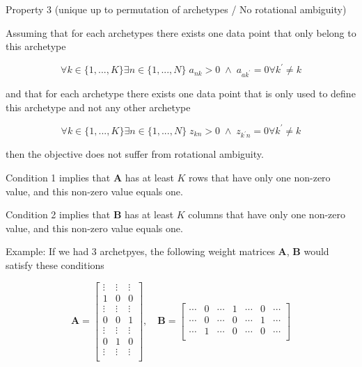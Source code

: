 \documentclass[oneside]{article}
\begin{document}
Property 3 (unique up to permutation of archetypes / No rotational ambiguity) 

Assuming that for each archetypes there exists one data point that only belong to this archetype

\begin{equation}
    \label{eq:cond1}
    \forall k \in \{1, ..., K\} \exists n \in \{1, ..., N\} \; a_{n k} > 0 \; \land \; a_{a k^\prime} = 0 \forall k^\prime \neq k
\end{equation}

and that for each archetype there exists one data point that is only used to define this archetype and not any other archetype

\begin{equation}
    \label{eq:cond2}
    \forall k \in \{1, ..., K\} \exists n \in \{1, ..., N\} \; z_{k n} > 0 \; \land \; z_{k^\prime n} = 0 \forall k^\prime \neq k
\end{equation}

then the objective does not suffer from rotational ambiguity. 

Condition 1 implies that $\mathbf{A}$ has at least $K$ rows that have only one non-zero value, and this non-zero value equals one.

Condition 2 implies that $\mathbf{B}$ has at least $K$ columns that have only one non-zero value, and this non-zero value equals one.

Example: If we had $3$ archetpyes, the following weight matrices $\mathbf{A}$, $\mathbf{B}$ would satisfy these conditions

\begin{equation}
    \mathbf{A} =     
    \left[
        \begin{array}{ccc}
            \vdots & \vdots & \vdots \\
            1 & 0 & 0 \\
            \vdots & \vdots & \vdots \\
            0 & 0 & 1 \\
            \vdots & \vdots & \vdots \\
            0 & 1 & 0 \\
            \vdots & \vdots & \vdots \\
        \end{array}
    \right]
    , \quad
    \mathbf{B} = 
    \left[
        \begin{array}{ccccccc}
            \cdots & 0 & \cdots & 1 & \cdots & 0 & \cdots \\
            \cdots & 0 & \cdots & 0 & \cdots & 1 & \cdots \\
            \cdots & 1 & \cdots & 0 & \cdots & 0 & \cdots \\
        \end{array}
    \right]
\end{equation}
\end{document}
